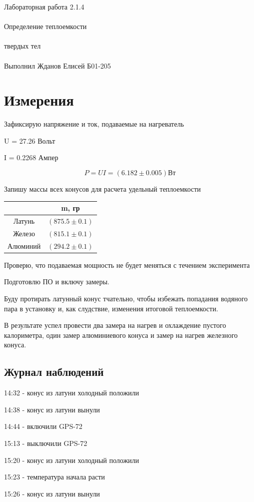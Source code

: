 \documentclass{astroedu-lab}
\begin{document}
\begin{problem}{\huge Лабораторная работа 2.1.4\\\\Определение теплоемкости\\\\твердых тел\\\\Выполнил Жданов Елисей Б01-205}
\section{Измерения}

Зафиксирую напряжение и ток, подаваемые на нагреватель

U = 27.26 Вольт

I = 0.2268 Ампер

\begin{equation}
	P = UI = (6.182 \pm 0.005) \text{Вт}
\end{equation}

Запишу массы всех конусов для расчета удельный теплоемкости

\begin{center}
\begin{tabular}{|c|c|}
\hline
& m, гр \\
\hline
Латунь & $(875.5 \pm 0.1)$ \\
Железо & $(815.1 \pm 0.1)$ \\
Алюминий & $(294.2 \pm 0.1)$ \\
\hline
\end{tabular}
\end{center}

Проверю, что подаваемая мощность не будет меняться с течением эксперимента

Подготовлю ПО и включу замеры.

Буду протирать латунный конус тчательно, чтобы избежать попадания водяного пара в установку и, как слудствие, изменения итоговой теплоемкости.

В результате успел провести два замера на нагрев и охлаждение пустого калориметра, один замер алюминиевого конуса и замер на нагрев железного конуса.

\subsection{Журнал наблюдений}

    14:32 - конус из латуни холодный положили
	
	14:38 - конус из латуни вынули
	
	14:44 - включили GPS-72
	
	15:13 - выключили GPS-72
	
	15:20 - конус из латуни холодный положили
	
	15:23 - температура начала расти
	
	15:26 - конус из латуни вынули
	

\end{problem}
\end{document}

